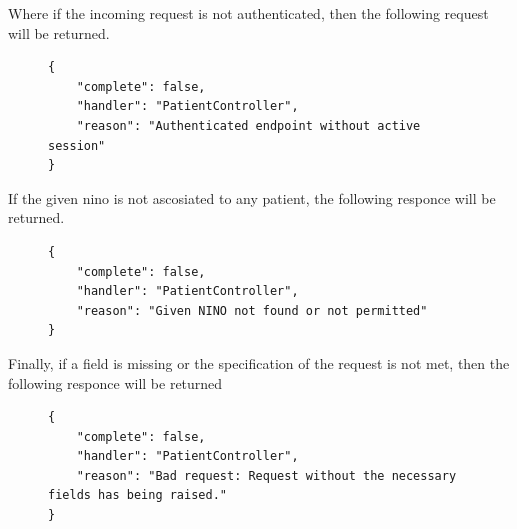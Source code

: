 					Where if the incoming request is not authenticated, then the following request will be returned.
					\begin{figure}[H]
						\iftrue
						\begin{lstlisting}[]
{
	"complete": false,
	"handler": "PatientController",
	"reason": "Authenticated endpoint without active session"
}
						\end{lstlisting}
					\end{figure}
					If the given nino is not ascosiated to any patient, the following responce will be returned.
					\begin{figure}[H]
						\iftrue
						\begin{lstlisting}[]
{
	"complete": false,
	"handler": "PatientController",
	"reason": "Given NINO not found or not permitted"
}
						\end{lstlisting}
					\end{figure}
					Finally, if a field is missing or the specification of the request is not met, then the following responce will be returned
					\begin{figure}[H]
						\iftrue
						\begin{lstlisting}[]
{
	"complete": false,
	"handler": "PatientController",
	"reason": "Bad request: Request without the necessary fields has being raised."
}					
						\end{lstlisting}
					\end{figure}

